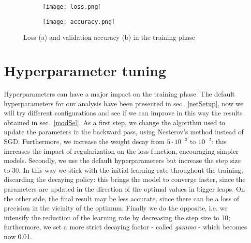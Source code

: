 \documentclass[11pt,twoside,a4paper]{article}
\begin{document}
\begin{figure}[]
    \centering
    \begin{subfigure}{0.45\textwidth}
	\texttt{[image: loss.png]}
        \caption{}
    \end{subfigure}
    \begin{subfigure}{0.45\textwidth}
	\texttt{[image: accuracy.png]}
        \caption{}
    \end{subfigure}
    \caption{Loss (a) and validation accuracy (b) in the training phase}
    \label{fig:modelSel}
\end{figure}

\section{Hyperparameter tuning}
\label{sec:hyperparams}
Hyperparameters can have a major impact on the training phase. The default hyperparameters for our analysis have been presented in sec.~\ref{netSetup}, now we will try different configurations and see if we can improve in this way the results obtained in sec.~\ref{modSel}.\newline
As a first step, we change the algorithm used to update the parameters in the backward pass, using Nesterov's method instead of SGD. Furthermore, we increase the weight decay from $5\cdot10^{-3}$ to $10^{-2}$: this increases the impact of regularization on the loss function, encouraging simpler models.\newline
Secondly, we use the default hyperparameters but increase the step size to 30. In this way we stick with the initial learning rate throughout the training, discarding the decaying policy: this brings the model to converge faster, since the parameters are updated in the direction of the optimal values in bigger leaps. On the other side, the final result may be less accurate, since there can be a loss of precision in the vicinity of the optimum.\newline
Finally we do the opposite, i.e. we intensify the reduction of the learning rate by decreasing the step size to 10; furthermore, we set a more strict decaying factor - called \textit{gamma} - which becomes now 0.01.
\end{document}
